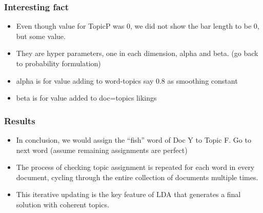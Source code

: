 \begin{frame}[fragile]\frametitle{Interesting fact}

  \begin{itemize}
	\item Even though value for TopicP was 0, we did not show the bar length to be 0, but some value.
	\item They are hyper parameters, one in each dimension, alpha and beta. (go back to probability formulation)
	\item alpha is for value adding to word-topics say 0.8 as smoothing constant
	\item beta is for value added to doc=topics likings
  \end{itemize}
  
\end{frame}
\begin{frame}[fragile]\frametitle{Results}
  \begin{itemize}
	\item In conclusion, we would assign the ``fish'' word of Doc Y to Topic F. Go to next word (assume remaining assignments are perfect)
  	\item   The process of checking topic assignment is repeated for each word in every document, cycling through the entire collection of documents multiple times. 
	\item This iterative updating is the key feature of LDA that generates a final solution with coherent topics.
  \end{itemize}
\end{frame}





